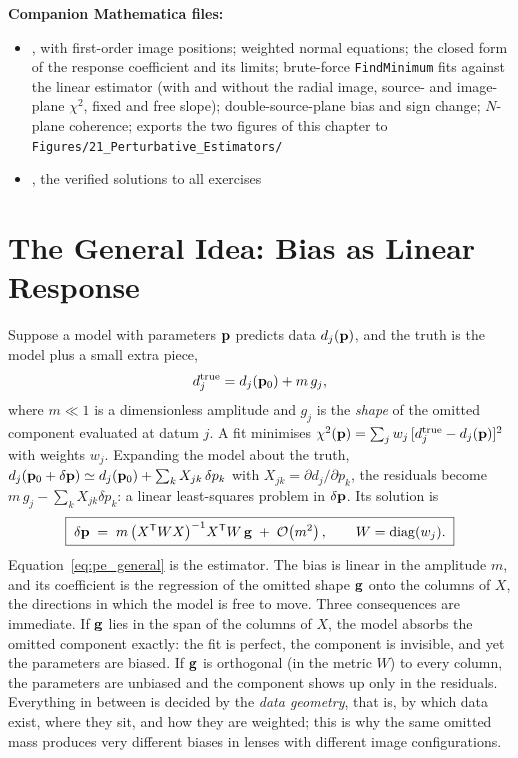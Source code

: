 \medskip
\noindent
\textbf{Companion Mathematica files:}
\begin{itemize}[nosep]
    \item {},
          with first-order image positions; weighted normal equations;
          the closed form of the response coefficient and its limits;
          brute-force \texttt{FindMinimum} fits against the linear
          estimator (with and without the radial image, source- and
          image-plane $\chi^2$, fixed and free slope);
          double-source-plane bias and sign change; $N$-plane coherence;
          exports the two figures of this chapter to
          \texttt{Figures/21\_Perturbative\_Estimators/}
    \item {},
          the verified solutions to all exercises
\end{itemize}

\section{The General Idea: Bias as Linear Response}
\label{sec:pe_idea}

Suppose a model with parameters $\vb{p}$ predicts data $d_j(\vb{p})$,
and the truth is the model plus a small extra piece,
\begin{equation}
    d_j^{\rm true} = d_j(\vb{p}_0) + m\,g_j ,
    \label{eq:pe_truth}
\end{equation}
where $m\ll1$ is a dimensionless amplitude and $g_j$ is the
\emph{shape} of the omitted component evaluated at datum $j$. A fit
minimises $\chi^2(\vb{p})=\sum_j w_j\,[d_j^{\rm true}-d_j(\vb{p})]^2$
with weights $w_j$. Expanding the model about the truth,
$d_j(\vb{p}_0+\delta\vb{p})\simeq d_j(\vb{p}_0)+\sum_k X_{jk}\,\delta p_k$
with $X_{jk}=\partial d_j/\partial p_k$, the residuals become
$m\,g_j-\sum_k X_{jk}\delta p_k$: a linear least-squares problem
in $\delta\vb{p}$. Its solution is
\begin{equation}
    \boxed{\;
    \delta\vb{p} \;=\; m\,\bigl(X^{\mathsf T}WX\bigr)^{-1}X^{\mathsf T}W\,\vb{g}
    \;+\;\mathcal{O}\!\left(m^2\right),
    \qquad W=\operatorname{diag}(w_j).\;}
    \label{eq:pe_general}
\end{equation}
Equation~\eqref{eq:pe_general} is the estimator. The bias is linear
in the amplitude $m$, and its coefficient is the regression of the
omitted shape $\vb{g}$ onto the columns of $X$, the directions in
which the model is free to move. Three consequences are immediate. If
$\vb{g}$ lies in the span of the columns of $X$, the model absorbs the
omitted component exactly: the fit is perfect, the component is
invisible, and yet the parameters are biased. If $\vb{g}$ is orthogonal
(in the metric $W$) to every column, the parameters are unbiased and the
component shows up only in the residuals. Everything in between is
decided by the \emph{data geometry}, that is, by which data exist,
where they sit, and how they are weighted; this is why the same omitted
mass produces very different biases in lenses with different image
configurations.

